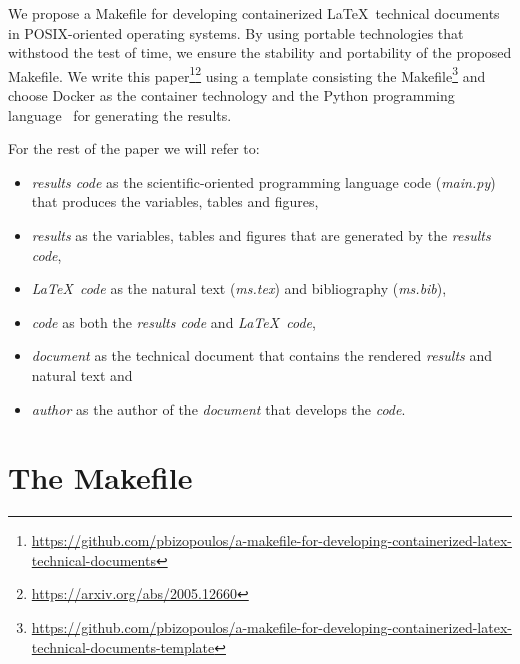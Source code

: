 \documentclass[journal]{IEEEtran}
\begin{document}
We propose a Makefile for developing containerized \LaTeX\ technical documents in POSIX-oriented operating systems.
By using portable technologies that withstood the test of time, we ensure the stability and portability of the proposed Makefile.
We write this paper\footnote{\url{https://github.com/pbizopoulos/a-makefile-for-developing-containerized-latex-technical-documents}}\footnote{\url{https://arxiv.org/abs/2005.12660}} using a template consisting the Makefile\footnote{\url{https://github.com/pbizopoulos/a-makefile-for-developing-containerized-latex-technical-documents-template}} and choose Docker as the container technology and the Python programming language~\cite{van2007python} for generating the results.

For the rest of the paper we will refer to:
\begin{itemize}
	\item \textit{results code} as the scientific-oriented programming language code (\textit{main.py}) that produces the variables, tables and figures,
	\item \textit{results} as the variables, tables and figures that are generated by the \textit{results code},
	\item \textit{\LaTeX\ code} as the natural text (\textit{ms.tex}) and bibliography (\textit{ms.bib}),
	\item \textit{code} as both the \textit{results code} and \textit{\LaTeX\ code},
	\item \textit{document} as the technical document that contains the rendered \textit{results} and natural text and
	\item \textit{author} as the author of the \textit{document} that develops the \textit{code}.
\end{itemize}

\section{The Makefile}
\end{document}
